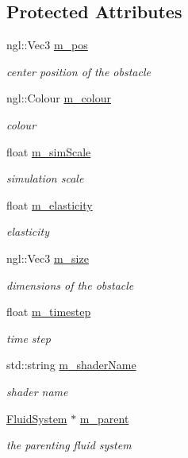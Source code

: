 \subsection*{Protected Attributes}
\begin{DoxyCompactItemize}
\item 
ngl::Vec3 \hyperlink{classObstacle_a7e390fb6bbe3b281e56c192138c19a27}{m\_\-pos}
\begin{DoxyCompactList}\small\item\em center position of the obstacle \item\end{DoxyCompactList}\item 
ngl::Colour \hyperlink{classObstacle_a0f812616869fc67cc7cb147f0e3524ef}{m\_\-colour}
\begin{DoxyCompactList}\small\item\em colour \item\end{DoxyCompactList}\item 
float \hyperlink{classObstacle_ae8815e4278c8e141c38e306e89439c57}{m\_\-simScale}
\begin{DoxyCompactList}\small\item\em simulation scale \item\end{DoxyCompactList}\item 
float \hyperlink{classObstacle_a60e24ee62597021b70f05e61b427132e}{m\_\-elasticity}
\begin{DoxyCompactList}\small\item\em elasticity \item\end{DoxyCompactList}\item 
ngl::Vec3 \hyperlink{classObstacle_a936746fd9203f709367d170255e5ad63}{m\_\-size}
\begin{DoxyCompactList}\small\item\em dimensions of the obstacle \item\end{DoxyCompactList}\item 
float \hyperlink{classObstacle_a00b57b81521105150839ba7b3846e95b}{m\_\-timestep}
\begin{DoxyCompactList}\small\item\em time step \item\end{DoxyCompactList}\item 
std::string \hyperlink{classObstacle_a83d931c2569ec99d17a483d7b88b2cdf}{m\_\-shaderName}
\begin{DoxyCompactList}\small\item\em shader name \item\end{DoxyCompactList}\item 
\hyperlink{classFluidSystem}{FluidSystem} $\ast$ \hyperlink{classObstacle_aaaeea9917fde7abb8fa8ca2ac73e51cb}{m\_\-parent}
\begin{DoxyCompactList}\small\item\em the parenting fluid system \item\end{DoxyCompactList}\end{DoxyCompactItemize}


